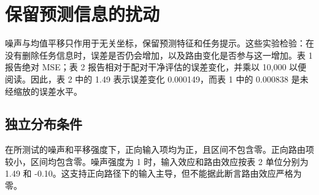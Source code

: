 \documentclass[10pt,letterpaper]{article}
\begin{document}
\section{保留预测信息的扰动}

噪声与均值平移只作用于无关坐标，保留预测特征和任务提示。这些实验检验：在没有删除任务信息时，误差是否仍会增加，以及路由变化是否参与这一增加。表 1 报告绝对 MSE；表 2 报告相对于配对干净评估的误差变化，并乘以 10,000 以便阅读。因此，表 2 中的 1.49 表示误差变化 0.000149，而表 1 中的 0.000838 是未经缩放的误差水平。


\begin{table}[!htbp]
\centering
\caption{五个训练种子上的绝对测试 MSE 均值。噪声与平移强度均为 1；遮挡删除 25\% 预测坐标且关闭指示变量；任务提示在 50\% 样本上删除。扰动前测试无关特征均无捷径偏移。MAC 和 Param 分别表示计算量匹配与参数量匹配的稠密网络。}
\label{tab:results1}
\small
\setlength{\tabcolsep}{4pt}
\renewcommand{\arraystretch}{1.1}
\ifdim\wd\reporttablebox>\linewidth
\resizebox{\linewidth}{!}{\usebox{\reporttablebox}}
\else\usebox{\reporttablebox}\fi
\end{table}


\subsection{独立分布条件}

在所测试的噪声和平移强度下，正向输入项均为正，且区间不包含零。正向路由项较小，区间均包含零。噪声强度为 1 时，输入效应和路由效应按表 2 单位分别为 1.49 和 -0.10。这支持正向路径下的输入主导，但不能据此断言路由效应严格为零。
\end{document}
